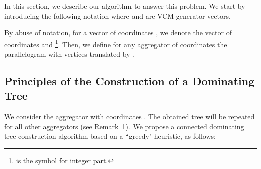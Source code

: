 In this section, we describe our algorithm to answer this problem. 
We start by introducing the following notation where  and  are VCM generator vectors.
\begin{notation}[Parallelogram ]
By abuse of notation, for a vector  of coordinates , we denote  the vector of coordinates  and \footnote{ is the symbol for integer part.}.
Then, we define for any aggregator  of coordinates   the parallelogram  with vertices  translated by . \end{notation}





\subsection{Principles of the Construction of a Dominating Tree}
We consider the aggregator with coordinates . The obtained tree will be repeated for all other aggregators (see Remark~1). We propose a connected dominating tree construction algorithm based on a ``greedy" heuristic, as follows:

